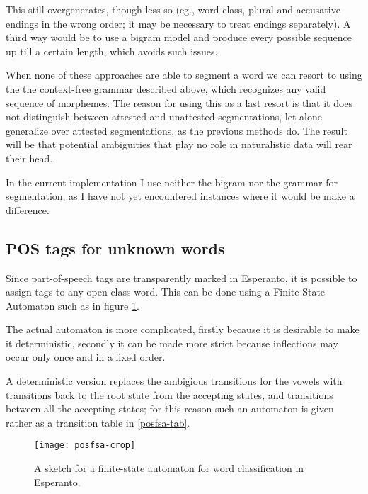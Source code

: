 \documentclass[10pt,a4paper]{article}
\begin{document}
This still overgenerates, though less so (eg., word class, plural and
accusative endings in the wrong order; it may be necessary to treat endings
separately). A third way would be to use a bigram model and produce every
possible sequence up till a certain length, which avoids such issues.

When none of these approaches are able to segment a word we can resort to
using the the context-free grammar described above, which recognizes any valid
sequence of morphemes. The reason for using this as a last resort is that it
does not distinguish between attested and unattested segmentations, let alone
generalize over attested segmentations, as the previous methods do. The result
will be that potential ambiguities that play no role in naturalistic data will
rear their head.

In the current implementation I use neither the bigram nor the grammar for
segmentation, as I have not yet encountered instances where it would be
make a difference.

\subsection{POS tags for unknown words}

Since part-of-speech tags are transparently marked in Esperanto, it is
possible to assign tags to any open class word. This can be done using a
Finite-State Automaton such as in figure \ref{posfsa}.

The actual automaton is more complicated, firstly because it is
desirable to make it deterministic, secondly it can be made more strict because
inflections may occur only once and in a fixed order.

A deterministic version replaces the ambigious transitions for the vowels with
transitions back to the root state from the accepting states, and transitions
between all the accepting states; for this reason such an automaton is given rather as
a transition table in \ref{posfsa-tab}.

\begin{figure}
\centering
\texttt{[image: posfsa-crop]}
\caption{A sketch for a finite-state automaton for word classification in
Esperanto.}
\label{posfsa}
\end{figure}
\end{document}
